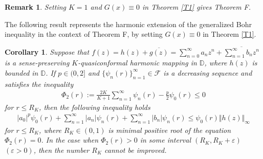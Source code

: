 \documentclass[11pt,reqno]{amsart}
\newtheorem{cor}{Corollary}[section]
\newtheorem{rem}{Remark}[section]
\newtheorem{open problem}{Open problem}[section]
\newcommand{\F}{{\mathcal{F}}}
\newcommand{\ol}{\overline}
\newcommand{\beas}{\begin{eqnarray*}}
\newcommand{\eeas}{\end{eqnarray*}}
\renewcommand{\epsilon}{\varepsilon}
\numberwithin{equation}{section}
\begin{document}
\begin{rem}Setting $K=1$ and $G(x)\equiv 0$ in \textrm{Theorem \ref{T1}} gives \textrm{Theorem F}.\end{rem}
\noindent The following result represents the harmonic extension of the generalized Bohr inequality in the context of \textrm{Theorem F}, by setting $G(x)\equiv 0$ in \textrm{Theorem \ref{T1}}.  
\begin{cor}\label{C1}
Suppose that $f(z)=h(z)+\ol{g(z)}=\sum_{n=0}^\infty a_n z^n+\ol{\sum_{n=1}^\infty b_n z^n}$ is a sense-preserving $K$-quasiconformal harmonic mapping in $\mathbb{D}$, where $h(z)$ is bounded in $\mathbb{D}$. If $p\in(0,2]$ and $\{\psi_n(r)\}_{n=1}^\infty\in\F$ is a decreasing sequence and satisfies the inequality
\beas
\Phi_2(r):=\frac{2K}{K+1}\sum_{n=1}^\infty \psi_n(r)-\frac{p}{2}\psi_0(r)\leq 0\eeas
for $ r\leq R_{K}$, 
then the following inequality holds 
\beas |a_0|^p\psi_0(r)+\sum_{n=1}^\infty |a_n| \psi_n(r)+\sum_{n=1}^\infty |b_n| \psi_n(r)\leq \psi_0(r)\Vert h(z)\Vert_\infty\eeas
for $ r\leq R_{K}$,
where $R_{K}\in(0,1)$ is minimal positive root of the equation $\Phi_2(r)=0$.
In the case when $\Phi_2(r)>0$ in some interval $(R_{K}, R_{K}+\epsilon)$ $(\epsilon>0)$, then the number $R_{K}$ cannot be improved.
\end{cor}
\end{document}
